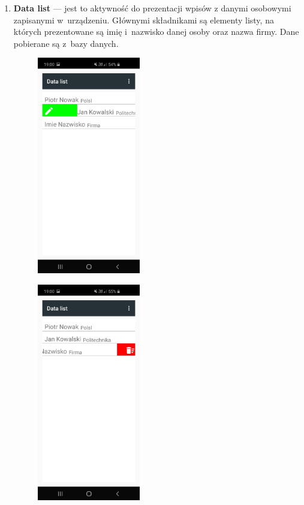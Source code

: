 \documentclass[a4paper,12pt, twoside]{article}
\begin{document}
\begin{enumerate}
    	   \item \textbf{Data list} — jest to aktywność do prezentacji wpisów z danymi osobowymi zapisanymi w~urządzeniu. Głównymi składnikami są elementy listy, na których prezentowane są imię i~nazwisko danej osoby oraz nazwa firmy. Dane pobierane są z~bazy danych.  
    	   \begin{figure}[H]
    	        \centering
    	        \begin{minipage}{.5\textwidth}
                    \centering
    	            \includegraphics[width=4.5cm]{images/view_dataList.jpg}
                    \label{fig:datalist}
                \end{minipage}%
    	        \begin{minipage}{.5\textwidth}
    	            \centering
    	            \includegraphics[width=4.5cm]{images/view_dataRemove.jpg}

\end{minipage}
\end{figure}
\end{enumerate}
\end{document}
